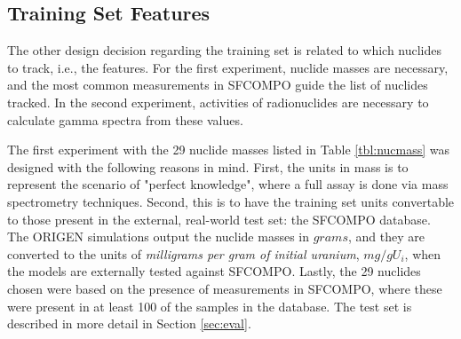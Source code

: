 \subsection{Training Set Features}
\label{sec:snffeats}

 The other design decision regarding the training set is related to
which nuclides to track, i.e., the features.  For the first experiment, nuclide
masses are necessary, and the most common measurements in \gls{SFCOMPO} guide
the list of nuclides tracked.  In the second experiment, activities of
radionuclides are necessary to calculate gamma spectra from these values.

The first experiment with the 29 nuclide masses listed in Table
\ref{tbl:nucmass} was designed with the following reasons in mind.  First, the
units in mass is to represent the scenario of "perfect knowledge", where a full
assay is done via mass spectrometry techniques.  Second, this is to have the
training set units convertable to those present in the external, real-world
test set: the \gls{SFCOMPO} database.  The \gls{ORIGEN} simulations output the
nuclide masses in $grams$, and they are converted to the units of
\textit{milligrams per gram of initial uranium}, $mg/gU_i$, when the models are
externally tested against \gls{SFCOMPO}. Lastly, the 29 nuclides chosen were
based on the presence of measurements in \gls{SFCOMPO}, where these were
present in at least 100 of the samples in the database.  The test set is
described in more detail in Section \ref{sec:eval}.

